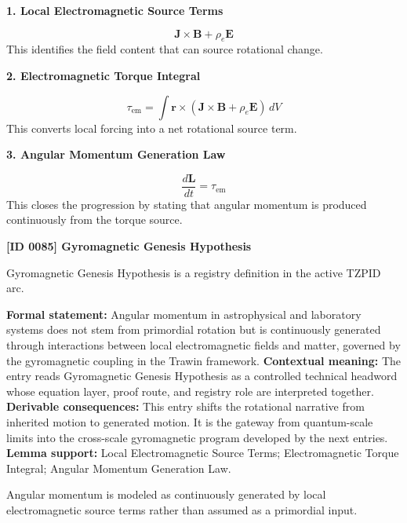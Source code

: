 \noindent\textbf{1. Local Electromagnetic Source Terms}\par
\[
\mathbf{J}\times\mathbf{B}+\rho_e\mathbf{E}
\]
\noindent This identifies the field content that can source rotational change.\par
\noindent\textbf{2. Electromagnetic Torque Integral}\par
\[
\tau_{\mathrm{em}}
=
\int \mathbf{r}\times\left(\mathbf{J}\times\mathbf{B}+\rho_e\mathbf{E}\right)\,dV
\]
\noindent This converts local forcing into a net rotational source term.\par
\noindent\textbf{3. Angular Momentum Generation Law}\par
\[
\frac{d\mathbf{L}}{dt}=\tau_{\mathrm{em}}
\]
\noindent This closes the progression by stating that angular momentum is produced continuously from the torque source.\par

\clearpage
\noindent\textbf{[ID 0085] Gyromagnetic Genesis Hypothesis}\par
\vspace{0.35em}
\begingroup\small
{}
Gyromagnetic Genesis Hypothesis is a registry definition in the active TZPID arc.

\begingroup\footnotesize\setlength{\emergencystretch}{3em}\sloppy
\textbf{Formal statement:} Angular momentum in astrophysical and laboratory systems does not stem from primordial rotation but is continuously generated through interactions between local electromagnetic fields and matter, governed by the gyromagnetic coupling in the Trawin framework. \textbf{Contextual meaning:} The entry reads Gyromagnetic Genesis Hypothesis as a controlled technical headword whose equation layer, proof route, and registry role are interpreted together. \textbf{Derivable consequences:} This entry shifts the rotational narrative from inherited motion to generated motion. It is the gateway from quantum-scale limits into the cross-scale gyromagnetic program developed by the next entries. \textbf{Lemma support:} Local Electromagnetic Source Terms; Electromagnetic Torque Integral; Angular Momentum Generation Law.\par
\endgroup

Angular momentum is modeled as continuously generated by local electromagnetic source terms rather than assumed as a primordial input.


